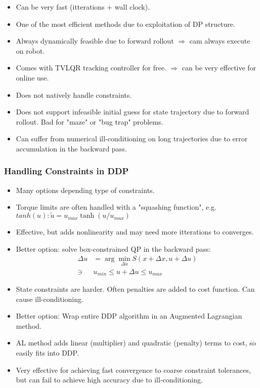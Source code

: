 \begin{itemize}
    \item Can be very fast (itterations + wall clock).
    \item One of the most efficient methods due to exploitation of DP structure.
    \item Always dynamically feasible due to forward rollout $\Rightarrow$ cam always execute on robot.
    \item Comes with TVLQR tracking controller for free. $\Rightarrow$ can be very effective for online use.
    \item Does not natively handle constraints.
    \item Does not support infeasible initial guess for state trajectory due to forward rollout. Bad for "maze" or "bug trap" problems.
    \item Can suffer from numerical ill-conditioning on long trajectories due to error accumulation in the backward pass.
\end{itemize}

\subsubsection{Handling Constraints in DDP}
\begin{itemize}
    \item Many options depending type of constraints.
    \item Torque limits are often handled with a "squashing function", e.g. $tanh(u): \tilde u = u_{max} \tanh(u/u_{max})$
    \item Effective, but adds nonlinearity and may need more itterations to converges.
    \item Better option: solve box-constrained QP in the backward pass:
    \begin{align}
        \Delta u & = \arg \min_{\Delta u} S(x + \Delta x, u + \Delta u) \\
        \ni & u_{min} \leq u + \Delta u \leq u_{max}
    \end{align}
    \item State constraints are harder. Often penalties are added to cost function. Can cause ill-conditioning.
    \item Better option: Wrap entire DDP algorithm in an Augmented Lagrangian method.
    \item AL method adds linear (multiplier) and quadratic (penalty) terms to cost, so easily fits into DDP.
    \item Very effective for achieving fast convergence to coarse constraint tolerances, but can fail to achieve high accuracy due to ill-conditioning.
\end{itemize}

